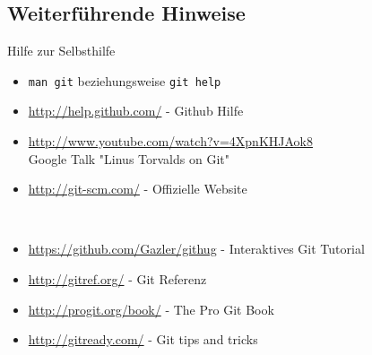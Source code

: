 \subsection{Weiterführende Hinweise}
\begin{frame}[fragile]{Hilfe zur Selbsthilfe}
	\begin{itemize}
		\item \verb|man git| beziehungsweise \verb|git help|
		\item \url{http://help.github.com/} - Github Hilfe
		\item \url{http://www.youtube.com/watch?v=4XpnKHJAok8} \\
			Google Talk "Linus Torvalds on Git"
		\item \url{http://git-scm.com/} - Offizielle Website
	\end{itemize}
\ \\

\tiny
	\begin{itemize}
		\item \url{https://github.com/Gazler/githug} - Interaktives Git Tutorial
		\item \url{http://gitref.org/} - Git Referenz
		\item \url{http://progit.org/book/} - The Pro Git Book
		\item \url{http://gitready.com/} - Git tips and tricks
	\end{itemize}
\end{frame}

